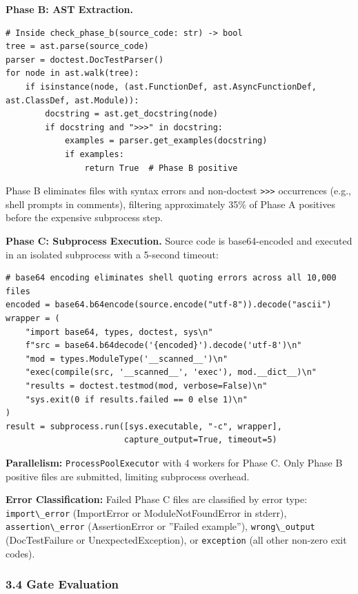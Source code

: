 \textbf{Phase B: AST Extraction.}

\begin{verbatim}
# Inside check_phase_b(source_code: str) -> bool
tree = ast.parse(source_code)
parser = doctest.DocTestParser()
for node in ast.walk(tree):
    if isinstance(node, (ast.FunctionDef, ast.AsyncFunctionDef, ast.ClassDef, ast.Module)):
        docstring = ast.get_docstring(node)
        if docstring and ">>>" in docstring:
            examples = parser.get_examples(docstring)
            if examples:
                return True  # Phase B positive
\end{verbatim}

Phase B eliminates files with syntax errors and non-doctest \texttt{>>>} occurrences (e.g., shell
prompts in comments), filtering approximately 35\% of Phase A positives before the expensive
subprocess step.

\textbf{Phase C: Subprocess Execution.} Source code is base64-encoded and executed in an isolated
subprocess with a 5-second timeout:

\begin{verbatim}
# base64 encoding eliminates shell quoting errors across all 10,000 files
encoded = base64.b64encode(source.encode("utf-8")).decode("ascii")
wrapper = (
    "import base64, types, doctest, sys\n"
    f"src = base64.b64decode('{encoded}').decode('utf-8')\n"
    "mod = types.ModuleType('__scanned__')\n"
    "exec(compile(src, '__scanned__', 'exec'), mod.__dict__)\n"
    "results = doctest.testmod(mod, verbose=False)\n"
    "sys.exit(0 if results.failed == 0 else 1)\n"
)
result = subprocess.run([sys.executable, "-c", wrapper],
                        capture_output=True, timeout=5)
\end{verbatim}

\textbf{Parallelism:} \texttt{ProcessPoolExecutor} with 4 workers for Phase C. Only Phase B positive
files are submitted, limiting subprocess overhead.

\textbf{Error Classification:} Failed Phase C files are classified by error type: \texttt{import\textbackslash \_error}
(ImportError or ModuleNotFoundError in stderr), \texttt{assertion\textbackslash \_error} (AssertionError or
''Failed example''), \texttt{wrong\textbackslash \_output} (DocTestFailure or UnexpectedException), or \texttt{exception}
(all other non-zero exit codes).

\subsubsection{3.4 Gate Evaluation}


